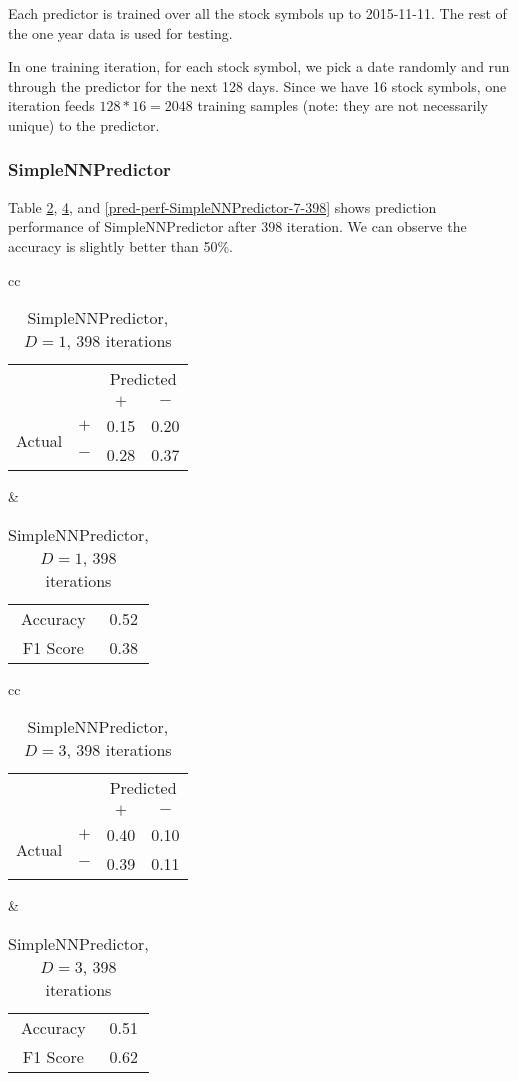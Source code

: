 \documentclass[twocolumn,10pt]{asme2ej}
\begin{document}
Each predictor is trained over all the stock symbols up to
2015-11-11. The rest of the one year data is used for testing.

In one training iteration, for each stock symbol, we pick a date
randomly and run through the predictor for the next 128 days. Since we
have 16 stock symbols, one iteration feeds $128 * 16 = 2048$ training
samples (note: they are not necessarily unique) to the predictor.


\subsubsection{SimpleNNPredictor}

Table \ref{pred-perf-SimpleNNPredictor-1-398}, \ref{pred-perf-SimpleNNPredictor-3-398}, and
\ref{pred-perf-SimpleNNPredictor-7-398} shows prediction performance of
SimpleNNPredictor after 398 iteration. We can observe the accuracy is slightly better than 50\%.

\begin{table}
  \begin{tabular}{cc}
    \begin{tabular}{cc|cc}
      & & \multicolumn{2}{c}{Predicted} \\
      & & $+ $ & $-$ \\
      \hline
      \multirow{2}{*}{Actual}
      & $+$ & 0.15 & 0.20 \\
      & $-$ & 0.28 & 0.37 \\
      \hline
    \end{tabular}
    &
    \begin{tabular}{cc}
      Accuracy & 0.52 \\
      F1 Score & 0.38 \\
    \end{tabular}
  \end{tabular}
  \caption{SimpleNNPredictor, $D=1$, 398 iterations}
  \label{pred-perf-SimpleNNPredictor-1-398}
\end{table}


\begin{table}
  \begin{tabular}{cc}
    \begin{tabular}{cc|cc}
      & & \multicolumn{2}{c}{Predicted} \\
      & & $+ $ & $-$ \\
      \hline
      \multirow{2}{*}{Actual}
      & $+$ & 0.40 & 0.10 \\
      & $-$ & 0.39 & 0.11 \\
      \hline
    \end{tabular}
    &
    \begin{tabular}{cc}
      Accuracy & 0.51 \\
      F1 Score & 0.62 \\
    \end{tabular}
  \end{tabular}
  \caption{SimpleNNPredictor, $D=3$, 398 iterations}
  \label{pred-perf-SimpleNNPredictor-3-398}
\end{table}
\end{document}

